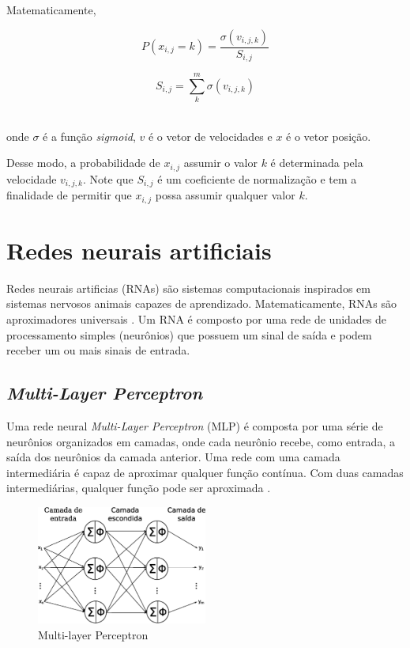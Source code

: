 Matematicamente,

\noindent\begin{minipage}{.5\linewidth}
$$
P(x_{i,j} = k) = \frac{\sigma (v_{i,j,k})}{S_{i,j}}
$$
\end{minipage}%
\begin{minipage}{.5\linewidth}
$$
S_{i,j} = \sum_{k}^{m} \sigma(v_{i,j,k})
$$
\end{minipage}\\

onde $\sigma$ é a função \textit{sigmoid}, $v$ é o vetor de velocidades e $x$ é o vetor posição.

Desse modo, a probabilidade de $x_{i,j}$ assumir o valor $k$ é determinada pela velocidade $v_{i,j,k}$. Note que $S_{i,j}$ é um coeficiente de normalização e tem a finalidade de permitir que $x_{i,j}$ possa assumir qualquer valor $k$.


\section{Redes neurais artificiais}
\label{sec:ann}

Redes neurais artificias (RNAs) são sistemas computacionais inspirados em sistemas nervosos animais capazes de aprendizado. Matematicamente, RNAs são aproximadores universais \cite{hornik1989universal}. Um RNA é composto por uma rede de unidades de processamento simples (neurônios) que possuem um sinal de saída e podem receber um ou mais sinais de entrada.

\subsection{\textit{Multi-Layer Perceptron}}

Uma rede neural \textit{Multi-Layer Perceptron} (MLP) é composta por uma série de neurônios organizados em camadas, onde cada neurônio recebe, como entrada, a saída dos neurônios da camada anterior. Uma rede com uma camada intermediária é capaz de aproximar qualquer função contínua. Com duas camadas intermediárias, qualquer função pode ser aproximada \cite{cybenko1989mlp}.

\begin{figure}[H]
    \centering
    \includegraphics[width=0.5\textwidth]{figures/mlp}
    \caption{Multi-layer Perceptron}
    \label{fig:mlp}
\end{figure}

